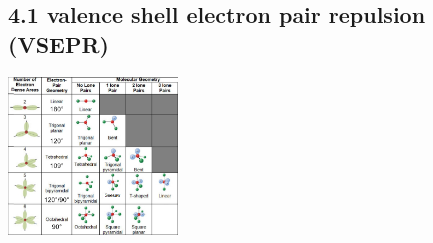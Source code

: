 \subsection{4.1 valence shell electron pair repulsion (VSEPR)}
    \centerline{\includegraphics[width=45mm]{src/4_Molecular_models/images/VSPER.PNG}}